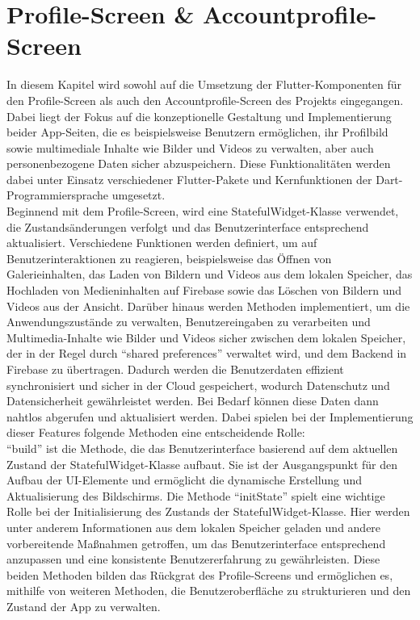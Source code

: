 \chapter{Profile-Screen \& Accountprofile-Screen}
In diesem Kapitel wird sowohl auf die Umsetzung der Flutter-Komponenten für den Profile-Screen als auch den Accountprofile-Screen des Projekts eingegangen.
Dabei liegt der Fokus auf die konzeptionelle Gestaltung und Implementierung beider App-Seiten, die es beispielsweise Benutzern ermöglichen, ihr Profilbild sowie multimediale Inhalte wie Bilder und Videos zu verwalten, aber auch personenbezogene Daten sicher abzuspeichern. 
Diese Funktionalitäten werden dabei unter Einsatz verschiedener Flutter-Pakete und Kernfunktionen der Dart-Programmiersprache umgesetzt. 
\\
Beginnend mit dem Profile-Screen, wird eine StatefulWidget-Klasse verwendet, die Zustandsänderungen verfolgt und das Benutzerinterface entsprechend aktualisiert.
Verschiedene Funktionen werden definiert, um auf Benutzerinteraktionen zu reagieren, beispielsweise das Öffnen von Galerieinhalten, das Laden von Bildern und Videos aus dem lokalen Speicher, das Hochladen von Medieninhalten auf Firebase sowie das Löschen von Bildern und Videos aus der Ansicht.
Darüber hinaus werden Methoden implementiert, um die Anwendungszustände zu verwalten, Benutzereingaben zu verarbeiten und Multimedia-Inhalte wie Bilder und Videos sicher zwischen dem lokalen Speicher, der in der Regel durch ``shared preferences'' verwaltet wird, und dem Backend in Firebase zu übertragen. 
Dadurch werden die Benutzerdaten effizient synchronisiert und sicher in der Cloud gespeichert, wodurch Datenschutz und Datensicherheit gewährleistet werden. 
Bei Bedarf können diese Daten dann nahtlos abgerufen und aktualisiert werden. Dabei spielen bei der Implementierung dieser Features folgende Methoden eine entscheidende Rolle:
\\``build'' ist die Methode, die das Benutzerinterface basierend auf dem aktuellen Zustand der StatefulWidget-Klasse aufbaut. Sie ist der Ausgangspunkt für den Aufbau der UI-Elemente und ermöglicht die dynamische Erstellung und Aktualisierung des Bildschirms. 
Die Methode ``initState'' spielt eine wichtige Rolle bei der Initialisierung des Zustands der StatefulWidget-Klasse. Hier werden unter anderem Informationen aus dem lokalen Speicher geladen und andere vorbereitende Maßnahmen getroffen, um das Benutzerinterface entsprechend anzupassen und eine konsistente Benutzererfahrung zu gewährleisten. 
Diese beiden Methoden bilden das Rückgrat des Profile-Screens und ermöglichen es, mithilfe von weiteren Methoden, die Benutzeroberfläche zu strukturieren und den Zustand der App zu verwalten.
